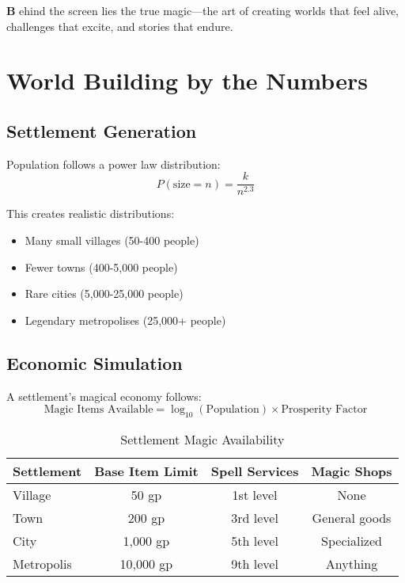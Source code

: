 \documentclass[11pt,letterpaper,openany]{book}
\newcommand{\firstletter}[1]{%
    \textcolor{bloodred}{\fontsize{48}{48}\selectfont\bfseries #1}%
}
\begin{document}
\firstletter{B}ehind the screen lies the true magic—the art of creating worlds that feel alive, challenges that excite, and stories that endure.

\section{World Building by the Numbers}

\subsection{Settlement Generation}

Population follows a power law distribution:
\begin{equation}
P(\text{size} = n) = \frac{k}{n^{2.3}}
\end{equation}

This creates realistic distributions:
\begin{itemize}
    \item Many small villages (50-400 people)
    \item Fewer towns (400-5,000 people)  
    \item Rare cities (5,000-25,000 people)
    \item Legendary metropolises (25,000+ people)
\end{itemize}

\subsection{Economic Simulation}

A settlement's magical economy follows:
\begin{equation}
\text{Magic Items Available} = \log_{10}(\text{Population}) \times \text{Prosperity Factor}
\end{equation}

\begin{table}[h]
\centering
\begin{tabular}{@{}lccc@{}}
\toprule
\textbf{Settlement} & \textbf{Base Item Limit} & \textbf{Spell Services} & \textbf{Magic Shops} \\
\midrule
Village & 50 gp & 1st level & None \\
Town & 200 gp & 3rd level & General goods \\
City & 1,000 gp & 5th level & Specialized \\
Metropolis & 10,000 gp & 9th level & Anything \\
\bottomrule
\end{tabular}
\caption{Settlement Magic Availability}
\end{table}
\end{document}
